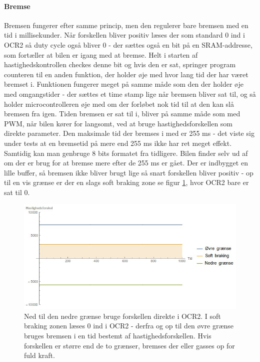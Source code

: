 \paragraph{Bremse}
Bremsen fungerer efter samme princip, men den regulerer bare bremsen med en tid i millisekunder. Når forskellen bliver positiv læses der som standard 0 ind i OCR2 så duty cycle også bliver 0 - der sættes også en bit på en SRAM-addresse, som fortæller at bilen er igang med at bremse. Helt i starten af hastighedskontrollen checkes denne bit og hvis den er sat, springer program counteren til en anden funktion, der holder øje med hvor lang tid der har været bremset i. Funktionen fungerer meget på samme måde som den der holder øje med omgangstider - der sættes et time stamp lige når bremsen bliver sat til, og så holder microcontrolleren øje med om der forløbet nok tid til at den kan slå bremsen fra igen. Tiden bremsen er sat til i, bliver på samme måde som med PWM, når bilen kører for langsomt, ved at bruge hastighedsforskellen som direkte parameter. Den maksimale tid der bremses i med er 255 ms - det viste sig under tests at en bremsetid på mere end 255 ms ikke har ret meget effekt. Samtidig kan man genbruge 8 bits formatet fra tidligere. Bilen finder selv ud af om der er brug for at bremse mere efter de 255 ms er gået. Der er indbygget en lille buffer, så bremsen ikke bliver brugt lige så snart forskellen bliver positiv - op til en vis grænse er der en slags soft braking zone se figur \ref{fig:Forgiveness}, hvor OCR2 bare er sat til 0. 

\begin{figure}[h]

	\centering
		\includegraphics[scale=0.4]{Billeder/Braking.jpg}
	\caption{Ned til den nedre grænse bruge forskellen direkte i OCR2. I soft braking zonen læses 0 ind i OCR2 - derfra og op til den øvre grænse bruges bremsen i en tid bestemt af hastighedsforskellen. Hvis forskellen er større end de to grænser, bremses der eller gasses op for fuld kraft.}
	\label{fig:Forgiveness}
	
\end{figure}


